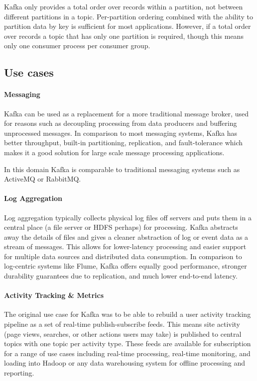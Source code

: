 Kafka only provides a total order over records within a partition, not between different partitions in a topic. Per-partition ordering combined with the ability to partition data by key is sufficient for most applications. However, if a total order over records a topic that has only one partition is required, though this means only one consumer process per consumer group. 

\subsection{Use cases}

\paragraph{Messaging}

Kafka can be used as a replacement for a more traditional message broker, used for reasons such as decoupling processing from data producers and buffering unprocessed messages. In comparison to most messaging systems, Kafka has better throughput, built-in partitioning, replication, and fault-tolerance which makes it a good solution for large scale message processing applications.

In this domain Kafka is comparable to traditional messaging systems such as ActiveMQ or RabbitMQ. 

\paragraph{Log Aggregation}

Log aggregation typically collects physical log files off servers and puts them in a central place (a file server or HDFS perhaps) for processing. Kafka abstracts away the details of files and gives a cleaner abstraction of log or event data as a stream of messages. This allows for lower-latency processing and easier support for multiple data sources and distributed data consumption. In comparison to log-centric systems like Flume, Kafka offers equally good performance, stronger durability guarantees due to replication, and much lower end-to-end latency. 
 
\paragraph{Activity Tracking \& Metrics}

The original use case for Kafka was to be able to rebuild a user activity tracking pipeline as a set of real-time publish-subscribe feeds. This means site activity (page views, searches, or other actions users may take) is published to central topics with one topic per activity type. These feeds are available for subscription for a range of use cases including real-time processing, real-time monitoring, and loading into Hadoop or any data warehousing system for offline processing and reporting.

